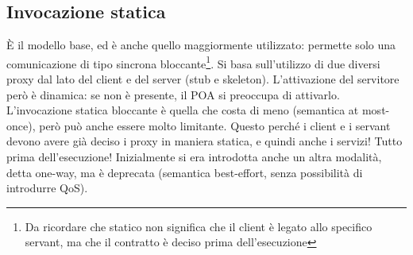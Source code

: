 \subsection{Invocazione statica}
È il modello base, ed è anche quello maggiormente utilizzato: permette solo una comunicazione di tipo sincrona 
bloccante\footnote{Da ricordare che statico non significa che il client è legato allo specifico servant, ma che il
contratto è deciso prima dell'esecuzione}. Si basa sull'utilizzo di due diversi proxy dal lato del client e del server 
(stub e skeleton). L'attivazione del servitore però è dinamica: se non è presente, il POA si preoccupa di attivarlo.
L'invocazione statica bloccante è quella che costa di meno (semantica at most-once), però può anche essere molto 
limitante. Questo perché i client e i servant devono avere già deciso i proxy in maniera statica, e quindi anche i
servizi! Tutto prima dell'esecuzione!
Inizialmente si era introdotta anche un altra modalità, detta one-way, ma è deprecata (semantica best-effort, senza 
possibilità di introdurre QoS).
